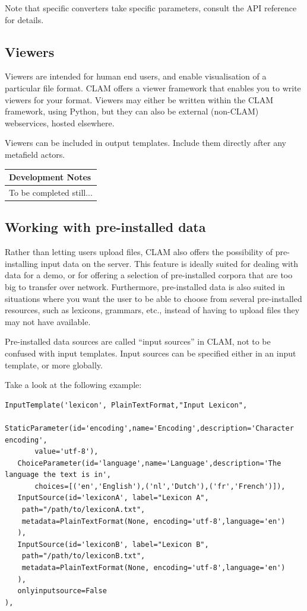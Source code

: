 \documentclass[a4paper,12pt]{report}
\newenvironment{devnotes}
{\newpage
\begin{center}
    \begin{tabular}[h!]{|p{0.8\textwidth}|}
    \hline
    {\bf Development Notes}\\\hline}
{   \\\hline
    \end{tabular}
\end{center}}
\begin{document}
Note that specific converters take specific parameters, consult the API reference for details.


\subsection{Viewers}

Viewers are intended for human end users, and enable visualisation of a particular file format. CLAM offers a viewer framework that enables you to write viewers for your format. Viewers may either be written within the CLAM framework, using Python, but they can also be external (non-CLAM) webservices, hosted elsewhere.

Viewers can be included in output templates. Include them directly after any metafield actors.

\begin{devnotes}
To be completed still...
\end{devnotes}


\subsection{Working with pre-installed data}

Rather than letting users upload files, CLAM also offers the possibility of pre-installing input data on the server. This feature is ideally suited for dealing with data for a demo, or for offering a selection of pre-installed corpora that are too big to transfer over network. Furthermore, pre-installed data is also suited in situations where you want the user to be able to choose from several pre-installed resources, such as lexicons, grammars, etc., instead of having to upload files they may not have available.

Pre-installed data sources are called ``input sources'' in CLAM, not to be confused with input templates. Input sources can be specified either in an input template, or more globally. 

Take a look at the following example:

\begin{verbatim}
InputTemplate('lexicon', PlainTextFormat,"Input Lexicon", 
   StaticParameter(id='encoding',name='Encoding',description='Character encoding',
       value='utf-8'),
   ChoiceParameter(id='language',name='Language',description='The language the text is in', 
       choices=[('en','English'),('nl','Dutch'),('fr','French')]),
   InputSource(id='lexiconA', label="Lexicon A",
    path="/path/to/lexiconA.txt", 
    metadata=PlainTextFormat(None, encoding='utf-8',language='en')
   ),
   InputSource(id='lexiconB', label="Lexicon B",
    path="/path/to/lexiconB.txt", 
    metadata=PlainTextFormat(None, encoding='utf-8',language='en')
   ),
   onlyinputsource=False
),            
\end{verbatim}
\end{document}
